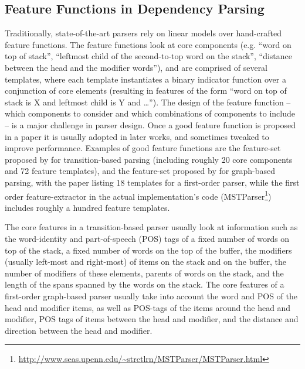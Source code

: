 \documentclass[11pt]{article}
\begin{document}
\subsection{Feature Functions in Dependency Parsing}
\label{subsec:feattemp}
Traditionally, state-of-the-art parsers rely on linear models over hand-crafted
feature functions.  The feature functions look at core components (e.g.
``word on top of stack'', ``leftmost child of the second-to-top word on the
stack'', ``distance between the head and the modifier words''), and are
comprised of several templates, where each template instantiates a binary
indicator function over a conjunction of core elements (resulting in features of
the form ``word on top of stack is X and leftmost child is Y and \ldots'').  The design of
the feature function -- which components to consider and which combinations of
components to include -- is a major challenge in parser design.
Once a good feature function is proposed in a paper it is usually adopted in later works,
and sometimes tweaked to improve performance.  Examples of good feature
functions are the feature-set proposed by  for
transition-based parsing (including roughly 20 core components and 72 feature
templates), and the feature-set proposed by  for graph-based parsing, with the paper listing 18
templates for a first-order parser, while the first order feature-extractor in the actual implementation's code (MSTParser\footnote{\url{http://www.seas.upenn.edu/~strctlrn/MSTParser/MSTParser.html}}) includes roughly a hundred feature templates.

The core features in a transition-based parser usually look at information such as the word-identity and
part-of-speech (POS) tags of a fixed number of words on top of the stack, a fixed
number of words on the top of the buffer, the modifiers (usually left-most and
right-most) of items on the stack and on the buffer, the number of modifiers of
these elements, parents of words on the stack, and the length of the spans spanned by the words on the stack.
The core features of a first-order graph-based parser usually take into account
the word and POS of the head and modifier items, as well as POS-tags of
the items around the
head and modifier, POS tags of items between the head and modifier,
and the distance and direction between the head and modifier.
\end{document}

